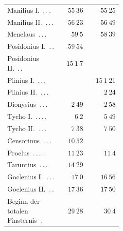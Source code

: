 \begin{center}
\begin{tabular}{@{}p{0.47\linewidth}|r|r@{}}
Manilius I.\ \mbox{.\,.\,.} & $55\ 36$ & $55\ 25$\\
Manilius II.\ \mbox{.\,.\,.} & $56\ 23$ & $56\ 49$\\
Menelaus\ \mbox{.\,.\,.} & $59\ 5$ & $58\ 39$\\
Posidonius I.\ \mbox{.\,.} & $59\ 54$ & \\
Posidonius II.\ \mbox{.\,.} & $15\ 1\ 7$ & \\
Plinius I.\ \mbox{.\,.\,.} &  & $15\ 1\ 21$\\
Plinius II.\ \mbox{.\,.\,.} &  & $2\ 24$\\
Dionysius\ \mbox{.\,.\,.} & $2\ 49$ & $-2\ 58$\\
Tycho I.\ \mbox{.\,.\,.\,.} & $6\ 2$ & $5\ 49$\\
Tycho II.\ \mbox{.\,.\,.} & $7\ 38$ & $7\ 50$\\
Censorinus\ \mbox{.\,.\,.} & $10\ 52$ & \\
Proclus\ \mbox{.\,.\,.\,.} & $11\ 23$ & $11\ 4$\\
Taruntius\ \mbox{.\,.\,.} & $14\ 29$ & \\
Goclenius I.\ \mbox{.\,.\,.} & $17\ 0$ & $16\ 56$\\
Goclenius II.\ \mbox{.\,.} & $17\ 36$ & $17\ 50$\\
Beginn der totalen Finsternis\ \mbox{.} & $29\ 28$ & $30\ 4$\\
\end{tabular}\endgroup\end{center}

